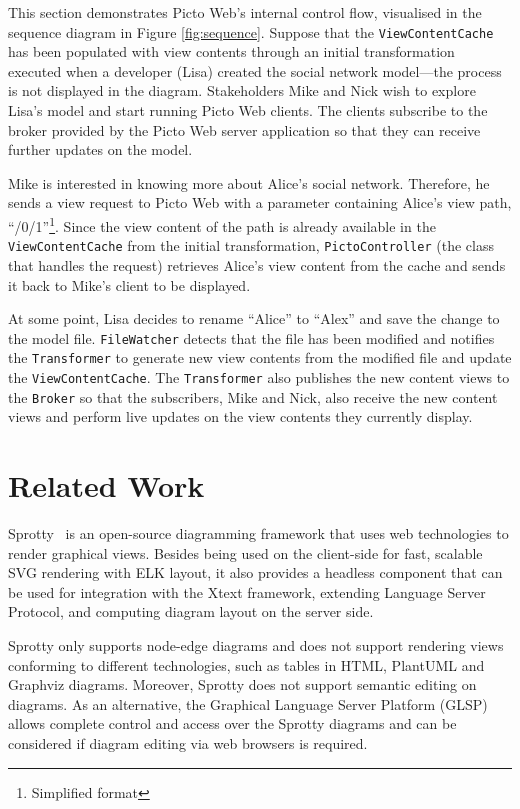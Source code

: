 \documentclass[sigconf,review]{acmart}
\begin{document}
This section demonstrates Picto Web's internal control flow, visualised in the sequence diagram in Figure \ref{fig:sequence}. Suppose that the \texttt{ViewContentCache} has been populated with view contents through an initial transformation executed when a developer (Lisa) created the social network model---the process is not displayed in the diagram. Stakeholders Mike and Nick wish to explore Lisa's model and start running Picto Web clients. The clients subscribe to the broker provided by the Picto Web server application so that they can receive further updates on the model. 

Mike is interested in knowing more about Alice's social network. Therefore, he sends a view request to Picto Web with a parameter containing Alice's view path, ``/0/1''\footnote{Simplified format}. Since the view content of the path is already available in the \texttt{ViewContentCache} from the initial transformation, \texttt{Picto\-Controller} (the class that handles the request) retrieves Alice's view content from the cache and sends it back to Mike's client to be displayed.

At some point, Lisa decides to rename ``Alice'' to ``Alex'' and save the change to the model file. \texttt{FileWatcher} detects that the file has been modified and notifies the \texttt{Transformer} to generate new view contents from the modified file and update the \texttt{ViewContentCache}. The \texttt{Transformer} also publishes the new content views to the \texttt{Broker} so that the subscribers, Mike and Nick, also receive the new content views and perform live updates on the view contents they currently display.

\section{Related Work}
Sprotty~\cite{sprotty2022git} is an open-source diagramming framework that uses web technologies to render graphical views. 
Besides being used on the client-side for fast, scalable SVG rendering with ELK layout, it also provides a headless component that can be used for integration with the Xtext framework, extending Language Server Protocol, and computing diagram layout on the server side. 

Sprotty only supports node-edge diagrams and does not support rendering views conforming to different technologies, such as tables in HTML, PlantUML and Graphviz diagrams. Moreover, Sprotty does not support semantic editing on diagrams. As an alternative, the Graphical Language Server Platform (GLSP)~\cite{eclipse2022glsp} allows complete control and access over the Sprotty diagrams and can be considered if diagram editing via web browsers is required.
\end{document}
